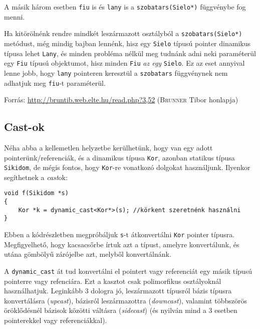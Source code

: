 \documentclass[a4paper,11.5pt,table]{article}
\begin{document}
	A másik három esetben \texttt{fiu} is és \texttt{lany} is a \texttt{szobatars(Sielo*)} függvénybe fog menni.
	
	\medskip
	Ha kitörölnénk rendre mindkét leszármazott osztályból a \texttt{szobatars(Sielo*)} metódust, még mindig bajban lennénk, hisz egy \texttt{Sielo} típusú pointer dinamikus típusa lehet \texttt{Lany}, és minden probléma nélkül meg tudnánk adni neki paraméterül egy \texttt{Fiu} típusú objektumot, hisz minden \texttt{Fiu} \textit{az egy} \texttt{Sielo}.  Ez az eset annyival lenne jobb, hogy \texttt{lany} pointeren keresztül a \texttt{szobatars} függvénynek nem adhatjuk meg \texttt{fiu}-t paraméterül.
	
	\medskip
	Forrás: \url{http://bruntib.web.elte.hu/read.php?3,52} (\textsc{Brunner} Tibor honlapja)
	
	\subsection{Cast-ok}
	
	Néha abba a kellemetlen helyzetbe kerülhetünk, hogy van egy adott pointerünk/referenciák, és a dinamikus típusa \texttt{Kor}, azonban statikus típusa \texttt{Sikidom}, de mégis fontos, hogy \texttt{Kor}-re vonatkozó dolgokat használjunk. Ilyenkor segíthetnek a \textit{cast}ok:
	\begin{lstlisting}
void f(Sikidom *s)
{
	Kor *k = dynamic_cast<Kor*>(s); //körkent szeretnénk használni
}
	\end{lstlisting}
	Ebben a kódrészletben megpróbáljuk \texttt{s}-t átkonvertálni \texttt{Kor} pointer típusra. Megfigyelhető, hogy kacsacsőrbe írtuk azt a típust, amelyre konvertálunk, és utána gömbölyű zárójelbe azt, melyből konvertálnánk.
	
	A \texttt{dynamic\_cast} át tud konvertálni el pointert vagy referenciát egy másik típusú pointerre vagy refenciára. Ezt a kasztot csak polimorfikus osztályoknál használhatjuk. Leginkább 3 dologra jó, leszármazott típusról bázis típusra konvertálásra (\textit{upcast}), bázisról leszármazottra (\textit{downcast}), valamint többszörös öröklődésnél bázisok közötti váltásra (\textit{sidecast}) (és nyilván mind a 3 esetben pointerekkel vagy referenciákkal).
	
\end{document}
